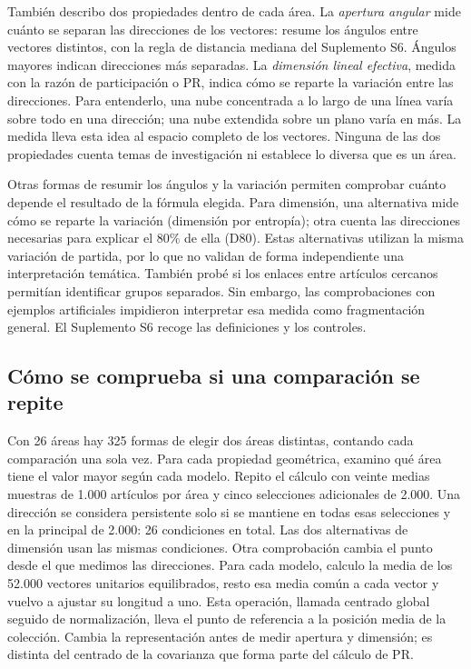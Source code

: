 \documentclass[12pt]{article}
\begin{document}
También describo dos propiedades dentro de cada área. La \emph{apertura angular} mide cuánto se separan las direcciones de los vectores: resume los ángulos entre vectores distintos, con la regla de distancia mediana del Suplemento S6. Ángulos mayores indican direcciones más separadas. La \emph{dimensión lineal efectiva}, medida con la razón de participación o PR, indica cómo se reparte la variación entre las direcciones. Para entenderlo, una nube concentrada a lo largo de una línea varía sobre todo en una dirección; una nube extendida sobre un plano varía en más. La medida lleva esta idea al espacio completo de los vectores. Ninguna de las dos propiedades cuenta temas de investigación ni establece lo diversa que es un área.

Otras formas de resumir los ángulos y la variación permiten comprobar cuánto depende el resultado de la fórmula elegida. Para dimensión, una alternativa mide cómo se reparte la variación (dimensión por entropía); otra cuenta las direcciones necesarias para explicar el 80\% de ella (D80). Estas alternativas utilizan la misma variación de partida, por lo que no validan de forma independiente una interpretación temática. También probé si los enlaces entre artículos cercanos permitían identificar grupos separados. Sin embargo, las comprobaciones con ejemplos artificiales impidieron interpretar esa medida como fragmentación general. El Suplemento S6 recoge las definiciones y los controles.

\subsection{Cómo se comprueba si una comparación se repite}
Con 26 áreas hay 325 formas de elegir dos áreas distintas, contando cada comparación una sola vez. Para cada propiedad geométrica, examino qué área tiene el valor mayor según cada modelo. Repito el cálculo con veinte medias muestras de 1.000 artículos por área y cinco selecciones adicionales de 2.000. Una dirección se considera persistente solo si se mantiene en todas esas selecciones y en la principal de 2.000: 26 condiciones en total. Las dos alternativas de dimensión usan las mismas condiciones. Otra comprobación cambia el punto desde el que medimos las direcciones. Para cada modelo, calculo la media de los 52.000 vectores unitarios equilibrados, resto esa media común a cada vector y vuelvo a ajustar su longitud a uno. Esta operación, llamada centrado global seguido de normalización, lleva el punto de referencia a la posición media de la colección. Cambia la representación antes de medir apertura y dimensión; es distinta del centrado de la covarianza que forma parte del cálculo de PR.
\end{document}
